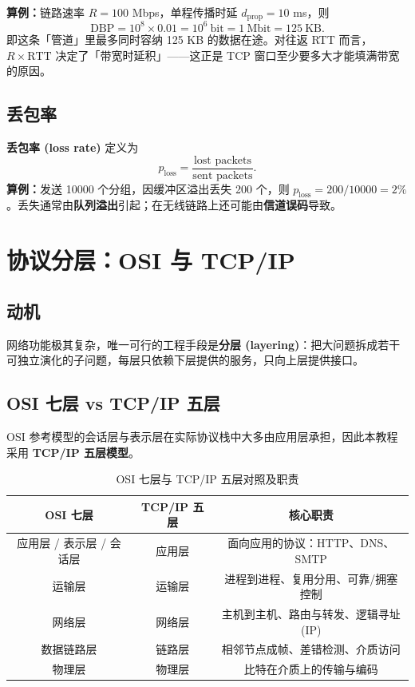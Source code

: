 \textbf{算例：}链路速率 $R = 100$ Mbps，单程传播时延 $d_{\text{prop}} = 10$ ms，则
\[
\text{DBP} = 10^{8} \times 0.01 = 10^{6}\ \text{bit} = 1\ \text{Mbit} = 125\ \text{KB}.
\]
即这条「管道」里最多同时容纳 125 KB 的数据在途。对往返 RTT 而言，$R\times\text{RTT}$ 决定了「带宽时延积」——这正是 TCP 窗口至少要多大才能填满带宽的原因。

\subsection{丢包率}
\textbf{丢包率 (loss rate)} 定义为
\begin{equation}
    p_{\text{loss}} = \frac{\text{lost packets}}{\text{sent packets}}.
\end{equation}
\textbf{算例：}发送 10000 个分组，因缓冲区溢出丢失 200 个，则 $p_{\text{loss}} = 200/10000 = 2\%$。丢失通常由\textbf{队列溢出}引起；在无线链路上还可能由\textbf{信道误码}导致。

\section{协议分层：OSI 与 TCP/IP}

\subsection{动机}
网络功能极其复杂，唯一可行的工程手段是\textbf{分层 (layering)}：把大问题拆成若干可独立演化的子问题，每层只依赖下层提供的服务，只向上层提供接口。

\subsection{OSI 七层 vs TCP/IP 五层}
OSI 参考模型的会话层与表示层在实际协议栈中大多由应用层承担，因此本教程采用 \textbf{TCP/IP 五层模型}。

\begin{table}[H]
\centering
\caption{OSI 七层与 TCP/IP 五层对照及职责}
\begin{tabulary}{\textwidth}{CCC}
\toprule
OSI 七层 & TCP/IP 五层 & 核心职责 \\
\midrule
应用层 / 表示层 / 会话层 & 应用层 & 面向应用的协议：HTTP、DNS、SMTP \\
运输层 & 运输层 & 进程到进程、复用分用、可靠/拥塞控制 \\
网络层 & 网络层 & 主机到主机、路由与转发、逻辑寻址 (IP) \\
数据链路层 & 链路层 & 相邻节点成帧、差错检测、介质访问 \\
物理层 & 物理层 & 比特在介质上的传输与编码 \\
\bottomrule
\end{tabulary}
\end{table}

